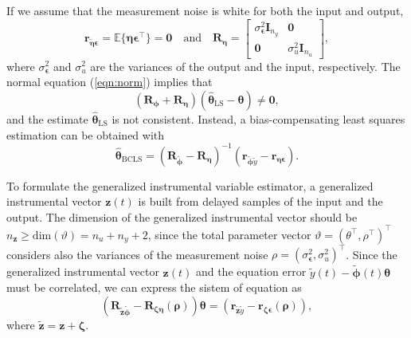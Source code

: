 \documentclass[11pt]{article}
\begin{document}
\begin{itemize}
\begin{itemize}
    If we assume that the measurement noise is white for both the input and output, 
    \begin{equation} \tag{4.30} \mathbf{r}_{\widetilde{\bm{\eta}} \bm{\epsilon}} = \mathbb{E}\{ \bm{\eta} \bm{\epsilon}^\top \} = \mathbf{0} \quad \mathrm{and} \quad \mathbf{R}_{\bm{\eta}} = \begin{bmatrix} \sigma_{\bm{\epsilon}}^2 \mathbf{I}_{n_y} & \mathbf{0} \\ \mathbf{0} & \sigma_u^2 \mathbf{I}_{n_u} \end{bmatrix}, \end{equation} 
    where $\sigma_{\bm{\epsilon}}^2$ and $\sigma_u^2$ are the variances of the output and the input, respectively. The normal equation (\ref{eqn:norm}) implies that 
    \begin{equation} \tag{4.31} \left( \mathbf{R}_{\bm{\phi}} + \mathbf{R}_{\bm{\eta}} \right)  \left( \widehat{\bm{\theta}}_{\mathrm{LS}} - \bm{\theta} \right) \neq \mathbf{0}, \end{equation}
    and the estimate $\widehat{\bm{\theta}}_{\mathrm{LS}}$ is not consistent.
    Instead, a bias-compensating least squares estimation can be obtained with  
    \begin{equation} \tag{4.32} \widehat{\bm{\theta}}_{\mathrm{BCLS}} = \left( \mathbf{R}_{\widetilde{\bm{\phi}}} - \mathbf{R}_{\bm{\eta}} \right)^{-1}  \left(  \mathbf{r}_{\widetilde{\bm{\phi}} \widetilde{y}} - \mathbf{r}_{\bm{\eta} \bm{\epsilon}} \right) . \end{equation}

    To formulate the generalized instrumental variable estimator, a generalized instrumental vector $\mathbf{z}(t)$ is built from delayed samples of the input and the output. 
    The dimension of the generalized instrumental vector should be $n_{\mathbf{z}} \geq \mathrm{dim} ( \vartheta ) = n_u + n_y + 2$, since the total parameter vector $\vartheta = \left( \theta^\top, \rho^\top \right)^\top$ considers also the variances of the measurement noise $\rho = \left( \sigma_{\bm{\epsilon}}^2, \sigma_u^2 \right)^\top$. 
    Since the generalized instrumental vector $\mathbf{z}(t)$ and the equation error $\widetilde{y}(t) - \widetilde{\bm{\phi}}(t) \bm{\theta}$ must be correlated, we can express the sistem of equation as 
    \begin{equation} \tag{4.33}\left( \mathbf{R}_{\widetilde{\mathbf{z}} \widetilde{\bm{\phi}}} - \mathbf{R}_{\bm{\zeta} \bm{\eta}} \left( \bm{\rho} \right) \right) \bm{\theta} = \left(  \mathbf{r}_{\widetilde{\mathbf{z}} \widetilde{y}} - \mathbf{r}_{\bm{\zeta} \bm{\epsilon}} \left( \bm{\rho} \right) \right) , \label{eqn:GIVE} \end{equation}
    where $\widetilde{\mathbf{z}} = \mathbf{z} + \bm{\zeta}$.


\end{itemize}
\end{itemize}
\end{document}
